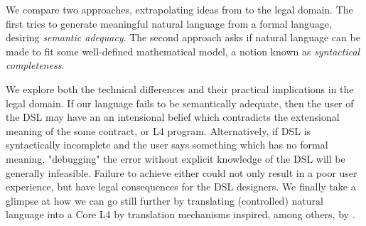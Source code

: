 \documentclass[runningheads]{llncs}
\begin{document}
We compare two approaches, extrapolating ideas from \cite{macmillan2021} to the legal domain. The first tries to generate meaningful natural language from a formal language, desiring \emph{semantic adequacy}. The second approach asks if natural language can be made to fit some well-defined mathematical model, a notion known as \emph{syntactical completeness}.


We explore both the technical differences and their practical implications in the legal domain. If our language fails to be semantically adequate, then the user of the DSL may have an an intensional belief which contradicts the extensional meaning of the some contract, or L4 program. Alternatively, if DSL is syntactically incomplete and the user says something which has no formal meaning, "debugging" the error without explicit knowledge of the DSL will be generally infeasible. Failure to achieve either could not only result in a poor user experience, but have legal consequences for the DSL designers. 
We finally take a glimpse at how we can go still further by translating (controlled) natural language into a Core L4 by translation mechanisms inspired, among others, by \cite{vanEijck2010computationalSemantics,schaefer_kohlhase_glif_2020}.





%
%
%
% 


\end{document}

